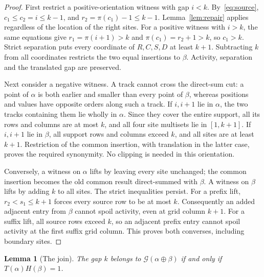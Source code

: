 \documentclass[11pt,a4paper]{article}
\newtheorem{lemma}[theorem]{Lemma}
\theoremstyle{remark}
\newcommand{\good}{\mathcal{G}}\newcommand{\skewsum}{\mathbin{\mathrm{skew}}}
\begin{document}
\begin{proof}
First restrict a positive-orientation witness with gap $i<k$.
By~\eqref{eq:source}, $c_1\le c_2=i\le k-1$, and
$r_2=\pi(c_1)-1\le k-1$. Lemma~\ref{lem:repair} applies regardless
of the location of the right sites.
For a positive witness with $i>k$, the same equations give
$r_1=\pi(i+1)>k$ and $\pi(c_1)=r_2+1>k$, so $c_1>k$.
Strict separation puts every coordinate of $R,C,S,D$ at least $k+1$.
Subtracting $k$ from all coordinates restricts the two equal insertions
to $\beta$. Activity, separation and the translated gap are preserved.

Next consider a negative witness. A track cannot cross the direct-sum
cut: a point of $\alpha$ is both earlier and smaller than every point
of $\beta$, whereas positions and values have opposite orders along
such a track. If $i,i+1$ lie in $\alpha$, the two tracks containing
them lie wholly in $\alpha$. Since they cover the entire support,
all its rows and columns are at most $k$, and all four site multisets
lie in $[1,k+1]$. If $i,i+1$ lie in $\beta$, all support rows and
columns exceed $k$, and all sites are at least $k+1$. Restriction of
the common insertion, with translation in the latter case, proves
the required synonymity. No clipping is needed in this orientation.

Conversely, a witness on $\alpha$ lifts by leaving every site unchanged;
the common insertion becomes the old common result direct-summed with
$\beta$. A witness on $\beta$ lifts by adding $k$ to all sites.
The strict inequalities persist. For a prefix lift,
$r_2<s_1\le k+1$ forces every source row to be at most $k$.
Consequently an added adjacent entry from $\beta$ cannot spoil activity,
even at grid column $k+1$. For a suffix lift, all source rows exceed
$k$, so an adjacent prefix entry cannot spoil activity at the first
suffix grid column. This proves both converses, including boundary sites.
\end{proof}

\begin{lemma}[The join]\label{lem:join}
The gap $k$ belongs to $\good(\alpha\oplus\beta)$ if and only if
$T(\alpha)H(\beta)=1$.
\end{lemma}
\end{document}
